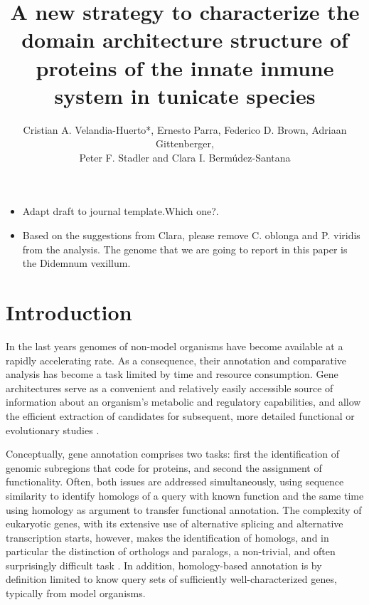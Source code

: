 \documentclass[11pt]{article}
\newcommand{\TODO}[1]{\begingroup\color{red}#1\endgroup}
\newcommand{\PFS}[1]{\begingroup\color{blue}#1\endgroup}
\begin{document}
\title{A new strategy to characterize the domain architecture structure of 
proteins of the innate inmune system in tunicate species}
\author{Cristian A. Velandia-Huerto*, Ernesto Parra, Federico D. 
Brown, Adriaan Gittenberger, \\ Peter F. Stadler and Clara I. 
Berm\'{u}dez-Santana}


\maketitle

\begin{itemize}
\item Adapt draft to journal template.\TODO{Which one?}. 
\item Based on the suggestions from Clara, please remove C. oblonga and P.
	viridis from the analysis. The genome that we are going to report in
	this paper is the Didemnum vexillum.
\end{itemize}

\section*{Introduction}

\PFS{In the last years genomes of non-model organisms have become available
  at a rapidly accelerating rate. As a consequence, their annotation and
  comparative analysis has become a task limited by time and resource
  consumption. Gene architectures serve as a convenient and relatively
  easily accessible source of information about an organism's metabolic and
  regulatory capabilities, and allow the efficient extraction of candidates
  for subsequent, more detailed functional or evolutionary studies
  \cite{aken2016ensembl,birney2004overview,ashburner2000gene,tatusov2000cog,tatusova2016ncbi}.}
  
  \PFS{Conceptually, gene annotation comprises two tasks: first the
  identification of genomic subregions that code for proteins, and second
  the assignment of functionality. Often, both issues are addressed
  simultaneously, using sequence similarity to identify homologs of a query
  with known function and the same time using homology as argument to
  transfer functional annotation. The complexity of eukaryotic genes, with
  its extensive use of alternative splicing and alternative transcription
  starts, however, makes the identification of homologs, and in particular
  the distinction of orthologs and paralogs, a non-trivial, and often
  surprisingly difficult task \cite{yandell2012}. In addition,
  homology-based annotation is by definition limited to know query sets of
  sufficiently well-characterized genes, typically from model organisms.}
\end{document}
